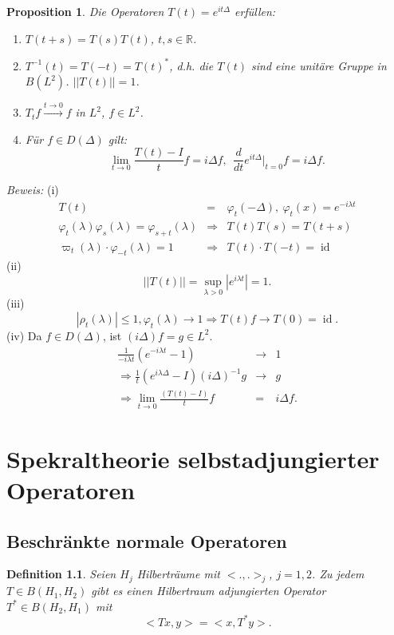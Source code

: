 \documentclass[12pt]{extreport} %
\newtheorem{Definition}[Satz]{Definition}
\newtheorem{Prop}[Satz]{Proposition}
\DeclareMathOperator{\id}{id}
\numberwithin{equation}{section}
\newcommand{\R}{\mathbb{R}} %
\newcommand{\m}{\cdot}
\newcommand{\Bew}{\emph{Beweis: }}
\newcommand{\laplace}{\Delta}
\begin{document}
	\begin{Prop}
		Die Operatoren $T(t) = e^{it\laplace}$ erfüllen:
		\begin{enumerate}
			\item[(i)] $T(t+s) = T(s)T(t)$, $t,s\in \R$.
			\item[(ii)] $T^{-1}(t) = T(-t) = T(t)^*$, d.h. die $T(t)$ sind eine unitäre Gruppe in $B(L^{2})$. $||T(t) ||= 1$.
			\item[(iii)] $T_t f\overset{t\rightarrow 0}{\longrightarrow}f$ in $L^2$, $f\in L^2$.
			\item[(iv)] Für $f\in D(\laplace)$ gilt:
			$$\lim\limits_{t\rightarrow 0}\frac{T(t)-I}{t}f = i\laplace f, ~~ \frac{d}{dt}e^{it\laplace}|_{t=0}f = i\laplace f.$$
		\end{enumerate}
	\end{Prop}
	
	\Bew (i) 
	\begin{eqnarray}
		T(t)&=&\varphi_t(-\laplace),~ \varphi_t(x) = e^{-i\lambda t}\nonumber\\
		\varphi_t(\lambda)\varphi_s(\lambda) = \varphi_{s+t}(\lambda)&\Rightarrow& T(t) T(s) = T(t+s)\nonumber\\
		\varpi_t(\lambda)\m\varphi_{-t}(\lambda)= 1&\Rightarrow& T(t)\m T(-t) = \id\nonumber
	\end{eqnarray}
	(ii) 
	$$||T(t)|| = \sup_{\lambda>0}|e^{i\lambda t}| =1.$$
	(iii)
	$$|\rho_t(\lambda)|\leq 1, \varphi_t(\lambda)\rightarrow 1\Rightarrow T(t)f\rightarrow T(0) =\id.$$
	(iv) Da $f\in D(\laplace)$, ist $(i\laplace)f=g\in L^2$.
	\begin{eqnarray}
		\frac{1}{-i\lambda t}(e^{-i\lambda t}-1)&\rightarrow& 1\nonumber\\
		\Rightarrow \frac{1}{t}(e^{i\lambda\laplace}- I)(i\laplace)^{-1}g&\rightarrow& g\nonumber\\
		\Rightarrow \lim\limits_{t\rightarrow 0}\frac{(T(t)-I)}{t}f &=& i\laplace f.\nonumber
	\end{eqnarray}
	
	\newpage
	\chapter{Spekraltheorie selbstadjungierter Operatoren}
	
	\section{Beschränkte normale Operatoren}
	
	\begin{Definition}
		Seien $H_j$ Hilberträume mit $<.,.>_j$, $j = 1,2$. Zu jedem $T\in B(H_1,H_2)$ gibt es einen Hilbertraum adjungierten Operator $T^*\in B(H_2,H_1)$ mit 
		$$<Tx,y> = <x,T^*y>.$$
	\end{Definition}
	
\end{document}
